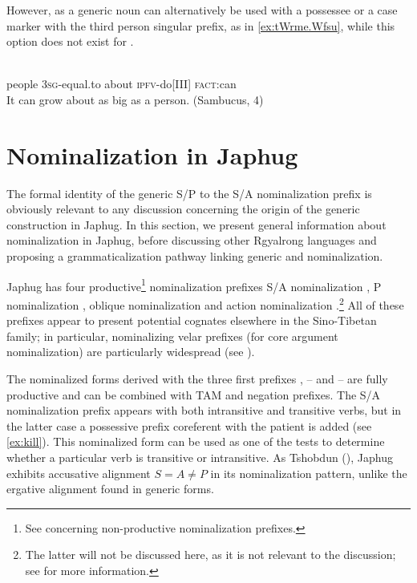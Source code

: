 However,  as a generic noun can alternatively be used with a possessee or a case marker with the third person singular  prefix, as in \ref{ex:tWrme.Wfsu}, while this option does not exist for .

\begin{exe}
\ex  \label{ex:tWrme.Wfsu}
\gll
 	 	 	 	 	 \\
people \textsc{3sg}-equal.to about \textsc{ipfv}-do[III] \textsc{fact}:can \\
\glt It can grow about as big as a person. (Sambucus, 4)
\end{exe}
 
 

 \section{Nominalization in Japhug} \label{sec:nmlz}
The formal identity of the generic S/P  to the S/A nominalization  prefix is obviously relevant to any discussion concerning the origin of the generic construction in Japhug. In this section, we present general information about nominalization in Japhug, before discussing other Rgyalrong languages and proposing a grammaticalization pathway linking generic and nominalization. 

Japhug has four productive\footnote{See \citet[4-6]{jacques14antipassive} concerning non-productive nominalization prefixes.} nominalization prefixes S/A nominalization ,   P nominalization ,   oblique nominalization   and   action nominalization .\footnote{The latter will not be discussed here, as it is not relevant to the discussion; see \citet[6-9]{jacques14antipassive}  for more information.}   All of these prefixes appear to present potential cognates elsewhere in the Sino-Tibetan family; in particular, nominalizing velar prefixes (for core argument nominalization) are particularly widespread (see \citealt{konnerth09nmlz}). 

 
The nominalized forms derived with the three first prefixes , -- and -- are fully productive and can be combined with TAM and negation prefixes.  The  S/A nominalization prefix appears with both intransitive and transitive verbs, but in the latter case a possessive prefix  coreferent with the patient is added (see \ref{ex:kill}). This nominalized form can be used as one of the tests to determine whether a particular verb is transitive or intransitive. As Tshobdun (\citealt{jackson03caodeng}),  Japhug exhibits accusative alignment $S=A\neq P$ in its nominalization pattern, unlike the ergative alignment found in generic forms. 

